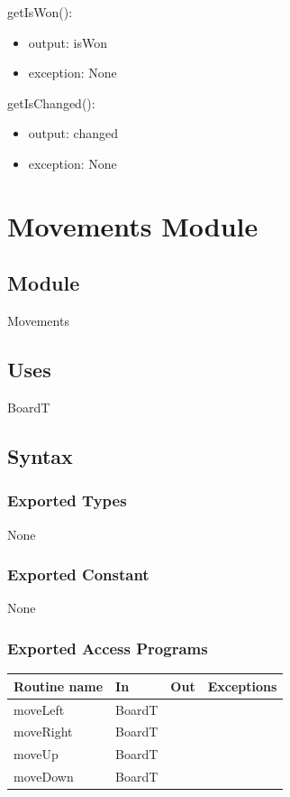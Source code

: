 \documentclass[12pt]{article}
\begin{document}
\noindent getIsWon():
\begin{itemize}
    \item output: isWon
    \item exception: None
\end{itemize}

\noindent getIsChanged():
\begin{itemize}
    \item output: changed
    \item exception: None
\end{itemize}

\newpage

\section* {Movements Module}

\subsection*{Module}
Movements

\subsection* {Uses}
BoardT
\subsection* {Syntax}
\subsubsection* {Exported Types}
None
\subsubsection* {Exported Constant}
None
\subsubsection* {Exported Access Programs}
\begin{tabular}{| l | l | l | l |}
\hline
\textbf{Routine name} & \textbf{In} & \textbf{Out} & \textbf{Exceptions}\\
\hline
moveLeft & BoardT &  & \\
\hline
moveRight & BoardT &  & \\
\hline
moveUp & BoardT &  & \\
\hline
moveDown & BoardT &  & \\
\hline
\end{tabular}
\end{document}
